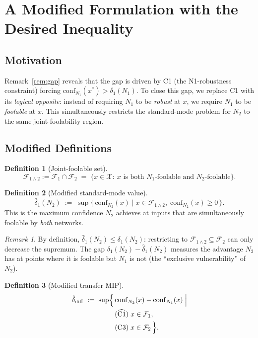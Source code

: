 \documentclass[12pt]{article}
\theoremstyle{definition}
\newtheorem{definition}{Definition}[section]
\theoremstyle{plain}
\theoremstyle{remark}
\newtheorem{remark}{Remark}[section]
\newcommand{\conf}[2]{\mathrm{conf}_{#1}(#2)}
\newcommand{\dN}[1]{\delta_1(N_{#1})}
\newcommand{\dNmod}[1]{\hat{\delta}_1(N_{#1})}
\newcommand{\ddiffmod}{\hat{\delta}_{\mathrm{diff}}}
\newcommand{\Xdom}{\mathcal{X}}
\newcommand{\Ffool}[1]{\mathcal{F}_{#1}}
\newcommand{\Fjoint}{\mathcal{F}_{1\wedge 2}}
\begin{document}
\section{A Modified Formulation with the Desired Inequality}\label{sec:modified}

\subsection{Motivation}

Remark~\ref{rem:gap} reveals that the gap is driven by C1 (the
N1-robustness constraint) forcing $\conf{N_1}{x^*}>\dN{1}$.  To close
this gap, we replace C1 with its \emph{logical opposite}: instead of
requiring $N_1$ to be \emph{robust} at $x$, we require $N_1$ to be
\emph{foolable} at $x$.  This simultaneously restricts the
standard-mode problem for $N_2$ to the same joint-foolability region.

\subsection{Modified Definitions}

\begin{definition}[Joint-foolable set]\label{def:joint}
\[
  \Fjoint := \Ffool{1}\cap\Ffool{2}
  \;=\;
  \bigl\{x\in\Xdom:\ x\text{ is both }N_1\text{-foolable and }N_2\text{-foolable}\bigr\}.
\]
\end{definition}

\begin{definition}[Modified standard-mode value]\label{def:delta1mod}
\[
  \dNmod{2}
  \;:=\;
  \sup\bigl\{\,\conf{N_2}{x}
    \;\big|\;
    x\in\Fjoint,\;
    \conf{N_2}{x}\geq 0
  \,\bigr\}.
\]
This is the maximum confidence $N_2$ achieves at inputs that are
simultaneously foolable by \emph{both} networks.
\end{definition}

\begin{remark}
By definition, $\dNmod{2}\leq\dN{2}$: restricting to $\Fjoint\subseteq\Ffool{2}$
can only decrease the supremum.  The gap $\dN{2}-\dNmod{2}$ measures
the advantage $N_2$ has at points where it is foolable but $N_1$ is not
(the ``exclusive vulnerability'' of $N_2$).
\end{remark}

\begin{definition}[Modified transfer MIP]\label{def:ddiffmod}
\begin{align}
  \ddiffmod
  \;:=\;\sup\Bigl\{\,
    &\conf{N_2}{x}-\conf{N_1}{x}
    \;\Big|\notag\\
    &(\widehat{\mathrm{C1}})\;x\in\Ffool{1},\notag\\
    &(\mathrm{C3})\;x\in\Ffool{2}
  \,\Bigr\}.\label{eq:ddiffmod}
\end{align}
\end{definition}
\end{document}
